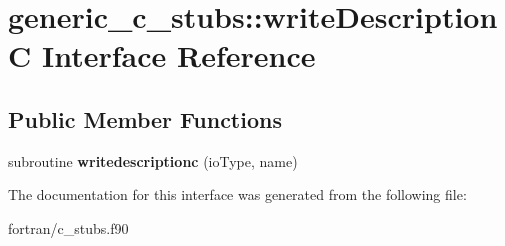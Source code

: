 \hypertarget{interfacegeneric__c__stubs_1_1write_description_c}{}\section{generic\+\_\+c\+\_\+stubs\+:\+:write\+DescriptionC Interface Reference}
\label{interfacegeneric__c__stubs_1_1write_description_c}
\subsection*{Public Member Functions}
\begin{DoxyCompactItemize}
\item 
\mbox{\label{interfacegeneric__c__stubs_1_1write_description_c_a80672fedd722804b2b2b82c221a718af}} 
subroutine {\bfseries writedescriptionc} (io\+Type, name)
\end{DoxyCompactItemize}


The documentation for this interface was generated from the following file\+:\begin{DoxyCompactItemize}
\item 
fortran/c\+\_\+stubs.\+f90\end{DoxyCompactItemize}
